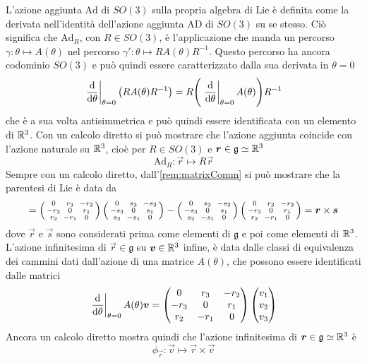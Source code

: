 L'azione aggiunta $\mathrm{Ad}$ di $SO(3)$ sulla propria algebra di Lie è definita come la derivata nell'identità dell'azione aggiunta $\mathrm{AD}$ di $SO(3) $ su se stesso. Ciò significa che $\mathrm{Ad}_R$, con $R \in SO(3)$, è l'applicazione che manda un percorso $\gamma: \theta \mapsto A(\theta)$ nel percorso $\gamma': \theta \mapsto R A(\theta) R^{-1}$. Questo percorso ha ancora codominio $SO(3)$ e può quindi essere caratterizzato dalla sua derivata in $\theta = 0$
\begin{equation}
\eval{\dv{\theta}}_{\theta=0} \big(R A(\theta)R^{-1}\big) = R \Bigg(\eval{\dv{\theta}}_{\theta=0} A(\theta)\Bigg) R^{-1}
\end{equation}  
che è a sua volta antisimmetrica e può quindi essere identificata con un elemento di $\mathbb{R}^3$. Con un calcolo diretto si può mostrare che l'azione aggiunta coincide con l'azione naturale su $\mathbb{R}^3$, cioè per $R \in SO(3)$ e $\boldsymbol{r} \in \mathfrak{g} \simeq \mathbb{R}^3$
\begin{equation}
\mathrm{Ad}_R: \vec{r} \mapsto R \vec{r}
\end{equation} 
Sempre con un calcolo diretto, dall'\autoref{rem:matrixComm} si può mostrare che la parentesi di Lie è data da
\begin{equation}
  [\vec{r},\vec{s}] = \left( \smqty{
    0 & r_3 & -r_2 \\
    -r_3 & 0 & r_1 \\
    r_2 & -r_1 & 0
  } \right)  \left( \smqty{
    0 & s_3 & -s_2 \\
    -s_3 & 0 & s_1 \\
    s_2 & -s_1 & 0
  } \right)  - \left( \smqty{
    0 & s_3 & -s_2 \\
    -s_3 & 0 & s_1 \\
    s_2 & -s_1 & 0
  } \right)  \left( \smqty{
    0 & r_3 & -r_2 \\
    -r_3 & 0 & r_1 \\
    r_2 & -r_1 & 0
  } \right)  = \vec{r} \times \vec{s} 
\end{equation} 
dove $\vec{r}$ e $\vec{s}$ sono considerati prima come elementi di $\mathfrak{g}$ e poi come elementi di $\mathbb{R}^3$. L'azione infinitesima di $\vec{r} \in \mathfrak{g}$ su $\boldsymbol{v} \in \mathbb{R}^3$ infine, è data dalle classi di equivalenza dei cammini dati dall'azione di una matrice $A(\theta)$, che possono essere identificati dalle matrici
\begin{equation}
\eval{\dv{\theta}}_{\theta=0} A(\theta) \vec{v} = \pmqty{
  0 & r_3 & -r_2 \\
  -r_3 & 0 & r_1 \\
  r_2 & -r_1 & 0
} \mqty(v_1 \\ v_2 \\v_3)
\end{equation} 
Ancora un calcolo diretto mostra quindi che l'azione infinitesima di $\boldsymbol{r} \in \mathfrak{g} \simeq \mathbb{R}^3$ è 
\begin{equation}
\phi_{\vec{r}}: \vec{v} \mapsto \vec{r}\times \vec{v}
\end{equation}

